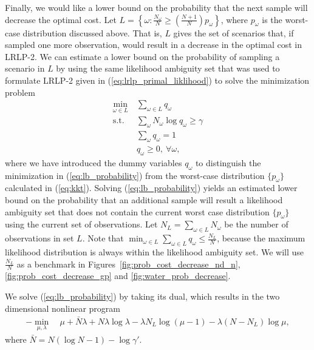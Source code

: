 \documentclass{iserc}
\begin{document}
Finally, we would like a lower bound on the probability that the next sample will decrease the optimal cost.
Let $L = \left\{ \omega : \frac{N_{\omega}}{N} \geq \left( \frac{N+1}{N} \right) p_\omega \right\}$, where $p_\omega$ is the worst-case distribution discussed above.
That is, $L$ gives the set of scenarios that, if sampled one more observation, would result in a decrease in the optimal cost in LRLP-2.
We can estimate a lower bound on the probability of sampling a scenario in $L$ by using the same likelihood ambiguity set that was used to formulate LRLP-2 given in (\ref{eq:lrlp_primal_liklihood}) to solve the minimization problem
\begin{align}
	\min_{\omega \in L} \ & \sum_{\omega \in L} q_\omega \nonumber \\
	\mbox{s.t.} & \sum_\omega N_\omega \log q_\omega \geq \gamma \label{eq:lb_probability} \\
	& \sum_\omega q_\omega = 1 \nonumber \\
	& q_\omega \geq 0, \ \forall \omega, \nonumber
\end{align}
where we have introduced the dummy variables $q_\omega$ to distinguish the minimization in (\ref{eq:lb_probability}) from the worst-case distribution $\{p_\omega\}$ calculated in (\ref{eq:kkt}). 
Solving (\ref{eq:lb_probability}) yields an estimated lower bound on the probability that an additional sample will result a likelihood ambiguity set that does not contain the current worst case distribution $\{p_\omega\}$ using the current set of observations. 
Let $N_L = \sum_{\omega \in L} N_\omega$ be the number of observations in set $L$. Note that $\min_{\omega \in L} \sum_{\omega \in L} q_\omega \leq \frac{N_L}{N}$, because the maximum likelihood distribution is always within the likelihood ambiguity set. We will use $\frac{N_L}{N}$ as a benchmark in Figures~\ref{fig:prob_cost_decrease_nd_n}, \ref{fig:prob_cost_decrease_gp} and \ref{fig:water_prob_decrease}. 

We solve (\ref{eq:lb_probability}) by taking its dual, which results in the two dimensional nonlinear program
\begin{align}
	-\min_{\mu,\lambda} \ & \mu + \bar{N}\lambda + N\lambda\log\lambda - \lambda N_L \log(\mu - 1) - \lambda (N-N_L) \log\mu, \label{eq:prob_cost_decrease}
\end{align}
where $\bar{N} = N(\log N - 1) - \log\gamma'$.
\end{document}
